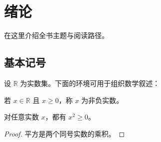 \chapter{绪论}

在这里介绍全书主题与阅读路径。

\section{基本记号}

设 $\mathbb{R}$ 为实数集。下面的环境可用于组织数学叙述：

\begin{definition}
若 $x\in\mathbb{R}$ 且 $x\geq 0$，称 $x$ 为非负实数。
\end{definition}

\begin{theorem}
对任意实数 $x$，都有 $x^2\geq 0$。
\end{theorem}

\begin{proof}
平方是两个同号实数的乘积。
\end{proof}
